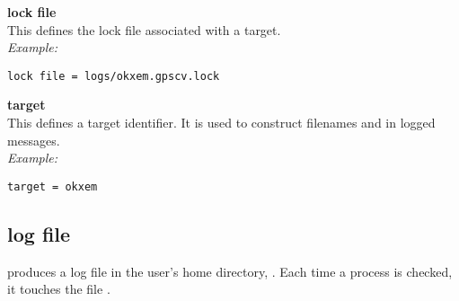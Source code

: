 {\bfseries lock file}\\
This defines the lock file associated with a target.\\
\textit{Example:}
\begin{lstlisting}
lock file = logs/okxem.gpscv.lock
\end{lstlisting}

{\bfseries target}\\
This defines a target identifier. It is used to construct filenames and in logged messages.\\
\textit{Example:}
\begin{lstlisting}
target = okxem
\end{lstlisting}

\subsection{log file}

 produces a log file in the user's home directory, . Each time 
a process is checked, it touches the file .